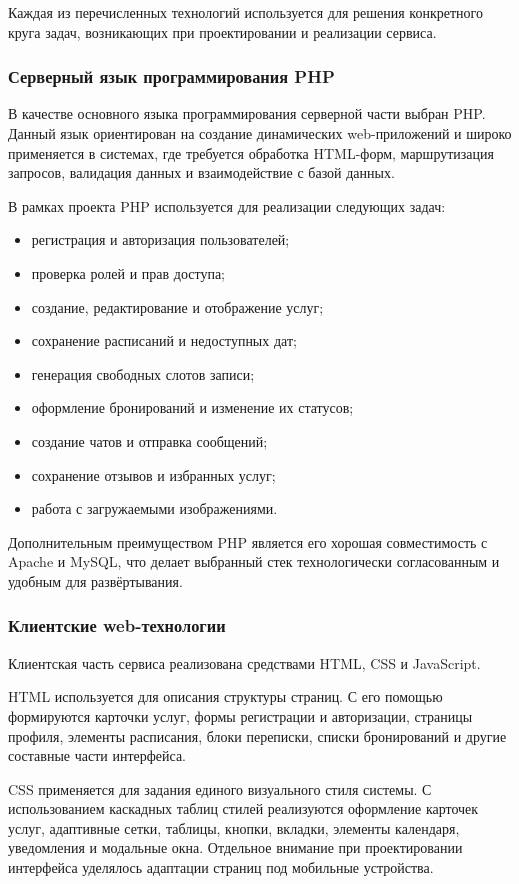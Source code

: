 Каждая из перечисленных технологий используется для решения конкретного круга задач, возникающих при проектировании и реализации сервиса.

\subsubsection{Серверный язык программирования PHP}

В качестве основного языка программирования серверной части выбран PHP. Данный язык ориентирован на создание динамических web-приложений и широко применяется в системах, где требуется обработка HTML-форм, маршрутизация запросов, валидация данных и взаимодействие с базой данных.

В рамках проекта PHP используется для реализации следующих задач:
\begin{itemize}
	\item регистрация и авторизация пользователей;
	\item проверка ролей и прав доступа;
	\item создание, редактирование и отображение услуг;
	\item сохранение расписаний и недоступных дат;
	\item генерация свободных слотов записи;
	\item оформление бронирований и изменение их статусов;
	\item создание чатов и отправка сообщений;
	\item сохранение отзывов и избранных услуг;
	\item работа с загружаемыми изображениями.
\end{itemize}

Дополнительным преимуществом PHP является его хорошая совместимость с Apache и MySQL, что делает выбранный стек технологически согласованным и удобным для развёртывания.

\subsubsection{Клиентские web-технологии}

Клиентская часть сервиса реализована средствами HTML, CSS и JavaScript.

HTML используется для описания структуры страниц. С его помощью формируются карточки услуг, формы регистрации и авторизации, страницы профиля, элементы расписания, блоки переписки, списки бронирований и другие составные части интерфейса.

CSS применяется для задания единого визуального стиля системы. С использованием каскадных таблиц стилей реализуются оформление карточек услуг, адаптивные сетки, таблицы, кнопки, вкладки, элементы календаря, уведомления и модальные окна. Отдельное внимание при проектировании интерфейса уделялось адаптации страниц под мобильные устройства.

